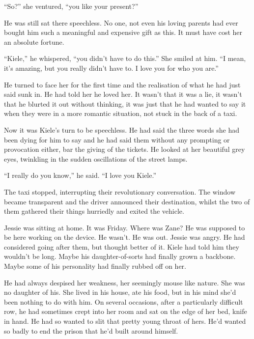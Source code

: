 ``So?'' she ventured, ``you like your present?''

He was still sat there speechless.  No one, not even his loving parents had ever bought him such a meaningful and expensive gift as this.  It must have cost her an absolute fortune.

``Kiele,'' he whispered, ``you didn't have to do this.''  She smiled at him.  ``I mean, it's amazing, but you really didn't have to.  I love you for who you are.''

He turned to face her for the first time and the realisation of what he had just said sunk in.  He had told her he loved her.  It wasn't that it was a lie, it wasn't that he blurted it out without thinking, it was just that he had wanted to say it when they were in a more romantic situation, not stuck in the back of a taxi.

Now it was Kiele's turn to be speechless.  He had said the three words she had been dying for him to say and he had said them without any prompting or provocation either, bar the giving of the tickets.  He looked at her beautiful grey eyes, twinkling in the sudden oscillations of the street lamps.

``I really do you know,'' he said.  ``I love you Kiele.''

The taxi stopped, interrupting their revolutionary conversation.  The window became transparent and the driver announced their destination, whilst the two of them gathered their things hurriedly and exited the vehicle.  



\thoughtbreak



Jessie was sitting at home.  It was Friday.  Where was Zane?  He was supposed to be here working on the device.  He wasn't.  He was out.  Jessie was angry.  He had considered going after them, but thought better of it.  Kiele had told him they wouldn't be long.  Maybe his daughter-of-sorts had finally grown a backbone.  Maybe some of his personality had finally rubbed off on her.

He had always despised her weakness, her seemingly mouse like nature.  She was no daughter of his.  She lived in his house, ate his food, but in his mind she'd been nothing to do with him.  On several occasions, after a particularly difficult row, he had sometimes crept into her room and sat on the edge of her bed, knife in hand.  He had so wanted to slit that pretty young throat of hers.  He'd wanted so badly to end the prison that he'd built around himself.  

